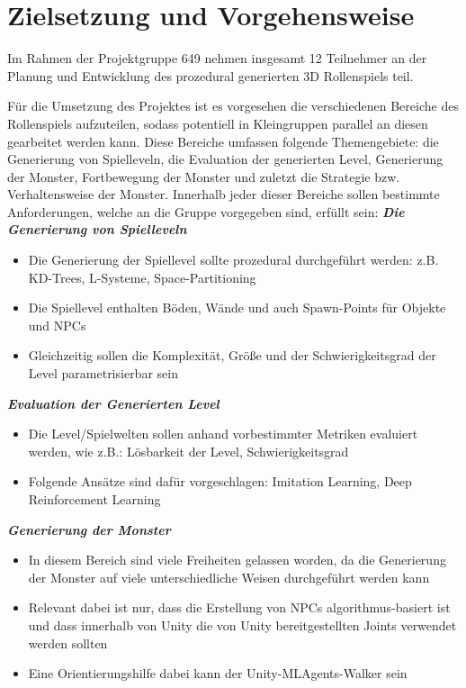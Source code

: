 \section{Zielsetzung und Vorgehensweise}
\label{Zielsetzung_und_Vorgehensweise}

Im Rahmen der Projektgruppe 649 nehmen insgesamt 12 Teilnehmer an der Planung und Entwicklung des prozedural generierten 3D Rollenspiels teil. 

Für die Umsetzung des Projektes ist es vorgesehen die verschiedenen Bereiche des Rollenspiels aufzuteilen, sodass potentiell in Kleingruppen parallel an diesen gearbeitet werden kann. Diese Bereiche umfassen folgende Themengebiete: die Generierung von Spielleveln, die Evaluation der generierten Level, Generierung der Monster, Fortbewegung der Monster und zuletzt die Strategie bzw. Verhaltensweise der Monster. Innerhalb jeder dieser Bereiche sollen bestimmte Anforderungen, welche an die Gruppe vorgegeben sind, erfüllt sein: \newline \newline
\textbf{\textit{Die Generierung von Spielleveln}}\newline
\begin{itemize}
	\item Die Generierung der Spiellevel sollte prozedural durchgeführt werden: z.B. KD-Trees, L-Systeme, Space-Partitioning
	\item Die Spiellevel enthalten Böden, Wände und auch Spawn-Points für Objekte und NPCs
	\item Gleichzeitig sollen die Komplexität, Größe und der Schwierigkeitsgrad der Level parametrisierbar sein
\end{itemize}
\textbf{\textit{Evaluation der Generierten Level}}
\begin{itemize}
	\item Die Level/Spielwelten sollen anhand vorbestimmter Metriken evaluiert werden, wie z.B.: Lösbarkeit der Level, Schwierigkeitsgrad
	\item Folgende Ansätze sind dafür vorgeschlagen: Imitation Learning, Deep Reinforcement Learning
\end{itemize}
\textbf{\textit{Generierung der Monster}}
\begin{itemize}
	\item In diesem Bereich sind viele Freiheiten gelassen worden, da die Generierung der Monster auf viele unterschiedliche Weisen durchgeführt werden kann
	\item Relevant dabei ist nur, dass die Erstellung von NPCs algorithmus-basiert ist und dass innerhalb von Unity die von Unity bereitgestellten Joints verwendet werden sollten
	\item Eine Orientierungshilfe dabei kann der Unity-MLAgents-Walker sein
\end{itemize}
